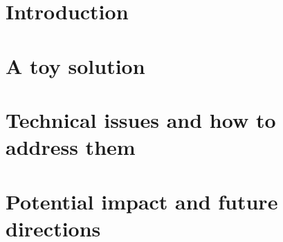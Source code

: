 \documentclass[conference]{IEEEtran}
\begin{document}
\section{Introduction}



\section{A toy solution}



\section{Technical issues and how to address them}



\section{Potential impact and future directions}

\end{document}
